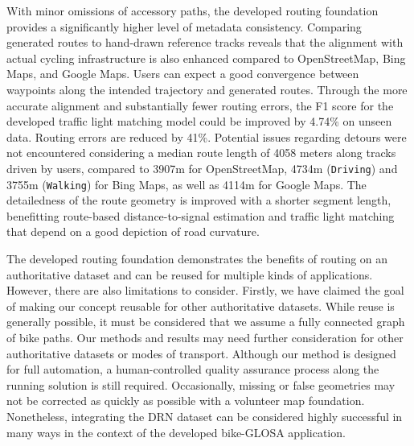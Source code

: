With minor omissions of accessory paths, the developed routing foundation provides a significantly higher level of metadata consistency. Comparing generated routes to hand-drawn reference tracks reveals that the alignment with actual cycling infrastructure is also enhanced compared to OpenStreetMap, Bing Maps, and Google Maps. Users can expect a good convergence between waypoints along the intended trajectory and generated routes. Through the more accurate alignment and substantially fewer routing errors, the F1 score for the developed traffic light matching model could be improved by 4.74\% on unseen data. Routing errors are reduced by 41\%. Potential issues regarding detours were not encountered considering a median route length of 4058 meters along tracks driven by users, compared to 3907m for OpenStreetMap, 4734m (\texttt{Driving}) and 3755m (\texttt{Walking}) for Bing Maps, as well as 4114m for Google Maps. The detailedness of the route geometry is improved with a shorter segment length, benefitting route-based distance-to-signal estimation and traffic light matching that depend on a good depiction of road curvature.

The developed routing foundation demonstrates the benefits of routing on an authoritative dataset and can be reused for multiple kinds of applications. However, there are also limitations to consider. Firstly, we have claimed the goal of making our concept reusable for other authoritative datasets. While reuse is generally possible, it must be considered that we assume a fully connected graph of bike paths. Our methods and results may need further consideration for other authoritative datasets or modes of transport. Although our method is designed for full automation, a human-controlled quality assurance process along the running solution is still required. Occasionally, missing or false geometries may not be corrected as quickly as possible with a volunteer map foundation. Nonetheless, integrating the DRN dataset can be considered highly successful in many ways in the context of the developed bike-GLOSA application.
